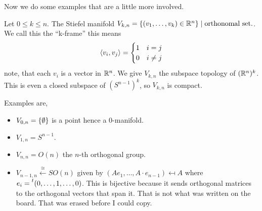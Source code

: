 \documentclass[language=english]{TemplateLecture}
\begin{document}
Now we do some examples that are a little more involved.

\begin{construction}
    Let \(0 \leq k \leq n\). The Stiefel manifold \(V_{k,n} = \{(v_1, \dots, v_k) \in \mathbb{R}^n\} \mid \text{orthonomal set.}\). We call this the \enquote{k-frame} this means
    \[\langle v_i, v_j\rangle = \begin{cases}
        1 & i = j \\
        0 & i \neq j
    \end{cases}\]
    note, that each \(v_i\) is a vector in \(\mathbb{R}^n\). We give \(V_{k,n}\) the subspace topology of \((\mathbb{R}^{n})^k\). This is even a closed subspace of \((S^{n-1})^k\), so \(V_{k,n}\) is compact.
\end{construction}

Examples are,
\begin{itemize}
    \item \(V_{0,n} = \{\emptyset\}\) is a point hence a \(0\)-manifold.
    \item \(V_{1,n} = S^{n-1}\).
    \item \(V_{n,n} = O(n)\) the \(n\)-th orthogonal group.
    \item \(V_{n-1, n} \xleftarrow{\cong} SO(n)\) given by \((Ae_1, \dots, A\cdot e_{n-1}) \mapsfrom A\) where \(e_i = \prescript{t}{}{(0,\dots, 1, \dots, 0)}\). This is bijective because it sends orthogonal matrices to the orthogonal vectors that span it. That is not what was written on the board. That was erased before I could copy.
\end{itemize}
\end{document}
